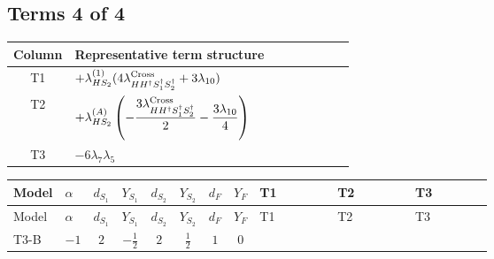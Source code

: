 \documentclass[8pt]{article}
\begin{document}
\begin{landscape}
\subsection*{Terms 4 of 4}
\begin{center}
\begin{tabular}{@{}c >{\raggedright\arraybackslash}p{0.82\linewidth}@{}}
\toprule
Column & Representative term structure \\
\midrule
T1 & \(\displaystyle +{\lambda_{HS_2}^{(1)}} (4 {\lambda_{H H^\dagger S_1^\dagger S_2^\dagger}^{\rm Cross}}+3 {\lambda_{10}})\) \\
\midrule
T2 & \(\displaystyle +{\lambda_{HS_2}^{(A)}} \left(-\frac{3 {\lambda_{H H^\dagger S_1^\dagger S_2^\dagger}^{\rm Cross}}}{2}-\frac{3 {\lambda_{10}}}{4}\right)\) \\
\midrule
T3 & \(\displaystyle -6 {\lambda_7} {\lambda_5}\) \\
\midrule
\bottomrule
\end{tabular}
\end{center}
\smallskip
\tiny
\begin{longtable}{@{}llcccccc >{\raggedright\arraybackslash}p{0.21\linewidth} >{\raggedright\arraybackslash}p{0.21\linewidth} >{\raggedright\arraybackslash}p{0.21\linewidth}@{}}
\toprule
Model & $\alpha$ & $d_{S_1}$ & $Y_{S_1}$ & $d_{S_2}$ & $Y_{S_2}$ & $d_F$ & $Y_F$ & T1 & T2 & T3 \\
\midrule
\endfirsthead
\toprule
Model & $\alpha$ & $d_{S_1}$ & $Y_{S_1}$ & $d_{S_2}$ & $Y_{S_2}$ & $d_F$ & $Y_F$ & T1 & T2 & T3 \\
\midrule
\endhead
T3-B & $-1$ & $2$ & $-\frac{1}{2}$ & $2$ & $\frac{1}{2}$ & $1$ & $0$ & \scriptsize\adjustbox{max width=\linewidth}{$\begin{gathered} +{\lambda_{HS_2}^{(1)}} (4 {\lambda_{H H^\dagger S_1^\dagger S_2^\dagger}^{\rm Cross}}+3 {\lambda_{10}})\end{gathered}$} & \scriptsize\adjustbox{max width=\linewidth}{$\begin{gathered} +{\lambda_{HS_2}^{(A)}} \left(-\frac{3 {\lambda_{H H^\dagger S_1^\dagger S_2^\dagger}^{\rm Cross}}}{2}-\frac{3 {\lambda_{10}}}{4}\right)\end{gathered}$} & \scriptsize\adjustbox{max width=\linewidth}{$\begin{gathered} -6 {\lambda_7} {\lambda_5}\end{gathered}$} \\
\midrule

\end{longtable}
\end{landscape}
\end{document}
